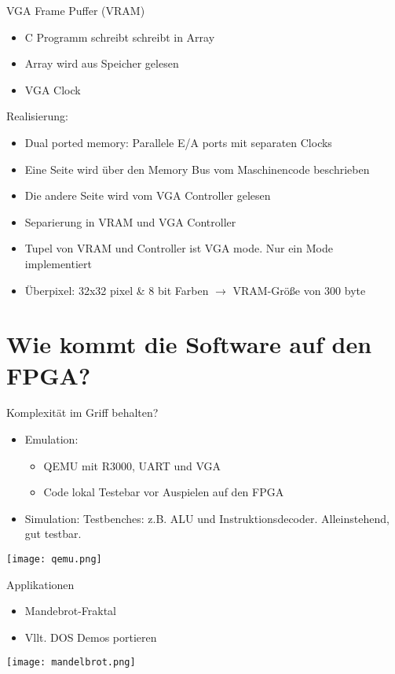 \begin{frame}{VGA Frame Puffer (VRAM)}
	\begin{itemize}
		\item C Programm schreibt schreibt in Array
		\item Array wird aus Speicher gelesen
		\item VGA Clock
	\end{itemize}
	\pause
	Realisierung:
	\begin{itemize}
		\item Dual ported memory: Parallele E/A ports mit separaten Clocks
		\item Eine Seite wird über den Memory Bus vom Maschinencode beschrieben
		\item Die andere Seite wird vom VGA Controller gelesen
		\item Separierung in VRAM und VGA Controller
		\item Tupel von VRAM und Controller ist VGA mode. Nur ein Mode implementiert
		\item Überpixel: 32x32 pixel \& 8 bit Farben $\rightarrow$ VRAM-Größe von 300 byte
	\end{itemize}

\end{frame}

\section{Wie kommt die Software auf den FPGA?}

\begin{frame}{Komplexität im Griff behalten?}

\begin{itemize}
\item Emulation:
\begin{itemize}
    \item QEMU mit R3000, UART und VGA
    \item Code lokal Testebar vor Auspielen auf den FPGA
\end{itemize}
    \item Simulation: Testbenches: z.B. ALU und Instruktionsdecoder. Alleinstehend, gut testbar.
\end{itemize}
\begin{center}
\texttt{[image: qemu.png]}
\end{center}

\end{frame}


\begin{frame}{Applikationen}
\begin{itemize}
\item Mandebrot-Fraktal
\item Vllt. DOS Demos portieren
\end{itemize}

\begin{center}
\texttt{[image: mandelbrot.png]}
\end{center}


\end{frame}

